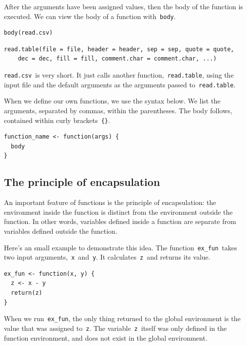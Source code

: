 \documentclass[
]{book}
\begin{document}
After the arguments have been assigned values, then the body of the function is executed. We can view the body of a function with~\texttt{body}.

\begin{verbatim}
body(read.csv)
\end{verbatim}

\begin{verbatim}
read.table(file = file, header = header, sep = sep, quote = quote,
    dec = dec, fill = fill, comment.char = comment.char, ...)
\end{verbatim}

\texttt{read.csv}~is very short. It just calls another function,~\texttt{read.table}, using the input file and the default arguments as the arguments passed to~\texttt{read.table}.

When we define our own functions, we use the syntax below. We list the arguments, separated by commas, within the parentheses. The body follows, contained within curly brackets~\texttt{\{\}}.

\begin{verbatim}
function_name <- function(args) {
  body
}
\end{verbatim}

\hypertarget{the-principle-of-encapsulation}{%
\subsection{The principle of encapsulation}\label{the-principle-of-encapsulation}}

An important feature of functions is the principle of encapsulation: the environment inside the function is distinct from the environment outside the function. In other words, variables defined inside a function are separate from variables defined outside the function.

Here's an small example to demonstrate this idea. The function~\texttt{ex\_fun}~takes two input arguments,~\texttt{x}~and~\texttt{y}. It calculates~\texttt{z}~and returns its value.

\begin{verbatim}
ex_fun <- function(x, y) {
  z <- x - y
  return(z)
}
\end{verbatim}

When we run~\texttt{ex\_fun}, the only thing returned to the global environment is the value that was assigned to~\texttt{z}. The variable~\texttt{z}~itself was only defined in the function environment, and does not exist in the global environment.
\end{document}
